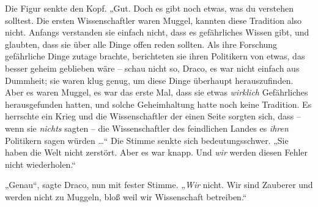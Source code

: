 Die Figur senkte den Kopf. „Gut. Doch es gibt noch etwas, was du verstehen solltest. Die ersten Wissenschaftler waren Muggel, kannten diese Tradition also nicht. Anfangs verstanden sie einfach nicht, dass es gefährliches Wissen gibt, und glaubten, dass sie über alle Dinge offen reden sollten. Als ihre Forschung gefährliche Dinge zutage brachte, berichteten sie ihren Politikern von etwas, das besser geheim geblieben wäre – schau nicht so, Draco, es war nicht einfach aus Dummheit; sie waren klug genug, um diese Dinge überhaupt herauszufinden. Aber es waren Muggel, es war das erste Mal, dass sie etwas \emph{wirklich} Gefährliches herausgefunden hatten, und solche Geheimhaltung hatte noch keine Tradition. Es herrschte ein Krieg und die Wissenschaftler der einen Seite sorgten sich, dass – wenn sie \emph{nichts} sagten – die Wissenschaftler des feindlichen Landes es \emph{ihren} Politikern sagen würden …“ Die Stimme senkte sich bedeutungsschwer. „Sie haben die Welt nicht zerstört. Aber es war knapp. Und \emph{wir} werden diesen Fehler nicht wiederholen.“

„Genau“, sagte Draco, nun mit fester Stimme. „\emph{Wir} nicht. Wir sind Zauberer und werden nicht zu Muggeln, bloß weil wir Wissenschaft betreiben.“

